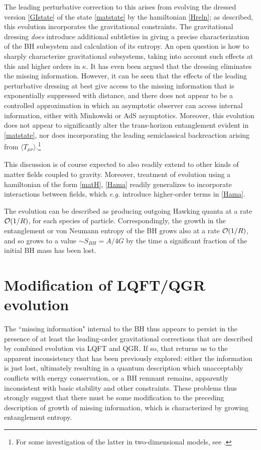 \documentclass[12pt]{article}
\numberwithin{equation}{section}
\newcommand{\calo}{{\cal O}}
\begin{document}
The leading perturbative correction to this arises from evolving the dressed version \eqref{GIstate} of the state \eqref{matstate} by the hamiltonian \eqref{Hreln}; as described, this evolution incorporates the gravitational constraints.
The gravitational dressing {\it does} introduce additional subtleties in giving a precise characterization of the BH subsystem and calculation of its entropy.
An open question is how to sharply characterize gravitational subsystems\cite{DoGi4,SGsplit,SGsub}, taking into account such effects at this and higher orders in $\kappa$.  It has even been argued that the dressing eliminates the missing information\cite{CGPR,LPRS}.  However, it can be seen that the effects of the leading perturbative dressing at best give access to the missing information that is exponentially suppressed with distance\cite{SGsub}, and there does not appear to be a controlled approximation in which an asymptotic observer can access internal information, either with Minkowski or AdS asymptotics.  Moreover, this evolution does not appear to significantly alter the trans-horizon entanglement evident in \eqref{matstate}, nor does incorporating the leading semiclassical backreaction arising from $\langle T_{\mu\nu}\rangle$.\footnote{For some investigation of the latter in two-dimensional models, see \cite{GiNe}.}   

This discussion is of course expected to also readily extend to other kinds of matter fields coupled to gravity.  Moreover, treatment of evolution using a hamiltonian of the form  \eqref{matH}, \eqref{Hama} readily generalizes to incorporate interactions between fields, which {\it e.g.} introduce higher-order terms in \eqref{Hama}.    

The evolution can be  described as producing outgoing Hawking quanta at a rate $\calo(1/R)$, for each species of particle.  Correspondingly, the growth in the entanglement or von Neumann entropy of the BH grows also at a rate $\calo(1/R)$, and so grows to a value $\sim S_{BH}=A/4G$  by the time a significant fraction of the initial BH mass has been lost.


\section{Modification of  LQFT/QGR evolution}

The ``missing information" internal to the BH thus appears to persist in the presence of at least the leading-order gravitational corrections that are described by combined evolution via LQFT and QGR.  If so, that returns us to the apparent inconsistency that has been previously explored: either the information is just lost\cite{Hawk-incoh}, ultimately resulting in a quantum description which unacceptably conflicts with energy conservation\cite{BPS}, or a BH remnant remains, apparently inconsistent with basic stability\cite{CaWi,Pres,WABHIP} and other\cite{Susstrouble} constraints.  These problems thus strongly suggest that there must be some  modification to the preceding description of growth of missing information, which is characterized by growing entanglement entropy.
\end{document}
